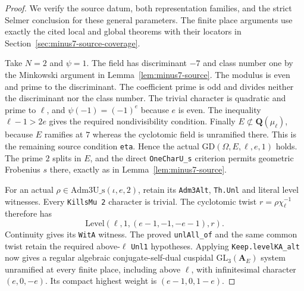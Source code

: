 \documentclass[11pt,a4paper]{article}
\theoremstyle{definition}
\begin{document}
\begin{proof}
We verify the source datum, both representation families, and the
strict Selmer conclusion for these general parameters. The finite
place arguments use exactly the cited local and global theorems
with their locators in Section~\ref{sec:minus7-source-coverage}.

Take $N=2$ and $\psi=1$. The field has discriminant $-7$ and class
number one by the Minkowski argument in Lemma~\ref{lem:minus7-source}.
The modulus is even and prime to the discriminant. The coefficient
prime is odd and divides neither the discriminant nor the class
number. The trivial character is quadratic and prime to $\ell$,
and $\psi(-1)=(-1)^e$ because $e$ is even. The inequality
$\ell-1>2e$ gives the required nondivisibility condition.
Finally $E\not\subset\mathbf Q(\mu_\ell)$, because $E$ ramifies
at $7$ whereas the cyclotomic field is unramified there. This is the
remaining source condition \texttt{eta}. Hence the actual
$\mathrm{GD}(\Omega,E,\ell,e,1)$ holds. The prime $2$ splits in
$E$, and the direct \texttt{OneCharU\_s} criterion permits geometric
Frobenius $s$ there, exactly as in Lemma~\ref{lem:minus7-source}.

For an actual $\rho\in\mathrm{Adm3U\_s}(\iota,e,2)$, retain its
\texttt{Adm3Alt}, \texttt{Th.Unl} and literal level witnesses.
Every \texttt{KillsMu 2} character is trivial. The cyclotomic twist
$r=\rho\chi_\ell^{-1}$ therefore has
\[
              \mathrm{Level}(\ell,1,(e-1,-1,-e-1),r).
\]
Continuity gives its \texttt{WitA} witness. The proved
\texttt{unlAll\_of} and the same common twist retain the required
above-$\ell$ \texttt{Unl1} hypotheses. Applying
\texttt{Keep.levelKA\_alt} now gives a regular algebraic
conjugate-self-dual cuspidal $\mathrm{GL}_3(\mathbf A_E)$ system
unramified at every finite place, including above $\ell$, with
infinitesimal character $(e,0,-e)$. Its compact highest weight is
$(e-1,0,1-e)$.


\end{proof}
\end{document}
